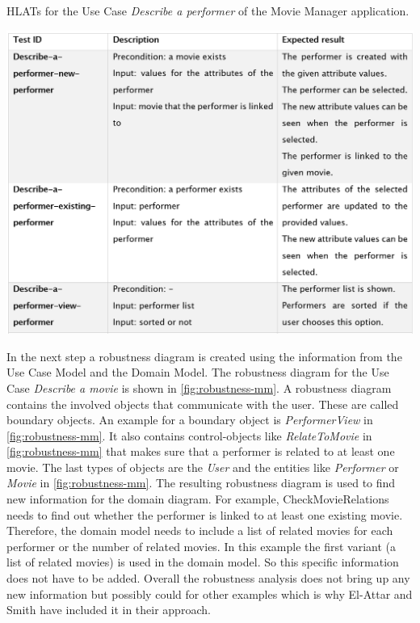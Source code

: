 \begin{table}[H]
	\caption{HLATs for the Use Case \textit{Describe a performer} of the Movie Manager application.}	
	\centering
	\includegraphics[width=.9\textwidth]{../images/ElAttarHLATs.png}
	\label{fig:hlats-mm}
\end{table}

In the next step a robustness diagram is created using the information from the Use Case Model and the Domain Model.
The robustness diagram for the Use Case \textit{Describe a movie} is shown in \autoref{fig:robustness-mm}.
A robustness diagram contains the involved objects that communicate with the user.
These are called boundary objects.
An example for a boundary object is \textit{PerformerView} in  \autoref{fig:robustness-mm}.
It also contains control-objects like \textit{RelateToMovie} in  \autoref{fig:robustness-mm} that makes sure that a performer is related to at least one movie.
The last types of objects are the \textit{User} and the entities like \textit{Performer} or \textit{Movie} in \autoref{fig:robustness-mm}.
The resulting robustness diagram is used to find new information for the domain diagram.
For example, CheckMovieRelations needs to find out whether the performer is linked to at least one existing movie.
Therefore, the domain model needs to include a list of related movies for each performer or the number of related movies.
In this example the first variant (a list of related movies) is used in the domain model.
So this specific information does not have to be added.
Overall the robustness analysis does not bring up any new information but possibly could for other examples which is why El-Attar and Smith have included it in their approach.


